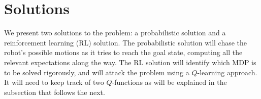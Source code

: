 \section{Solutions}
\label{sec:solutions}
%
We present two solutions to the problem: a probabilistic solution and a
reinforcement learning (RL) solution. The probabilistic solution will chase the
robot's possible motions as it tries to reach the goal state, computing all the
relevant expectations along the way. The RL solution will identify which MDP is
to be solved rigorously, and will attack the problem using a $Q$-learning
approach. It will need to keep track of two $Q$-functions as will be explained 
in the subsection that follows the next.



